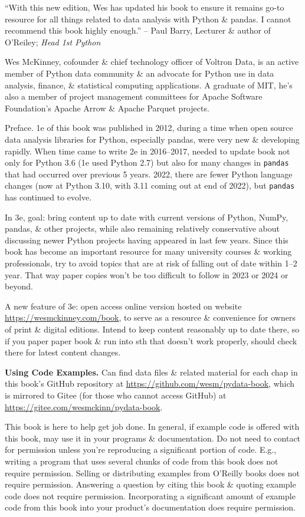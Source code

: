 \documentclass{article}
\begin{document}
``With this new edition, {\sc Wes} has updated his book to ensure it remains go-to resource for all things related to data analysis with Python \& pandas. I cannot recommend this book highly enough.'' -- {\sc Paul Barry}, Lecturer \& author of O'Reiley; {\it Head 1st Python}

{\sc Wes McKinney}, cofounder \& chief technology officer of Voltron Data, is an active member of Python data community \& an advocate for Python use in data analysis, finance, \& statistical computing applications. A graduate of MIT, he's also a member of project management committees for Apache Software Foundation's Apache Arrow \& Apache Parquet projects.

{\sf Preface.} 1e of this book was published in 2012, during a time when open source data analysis libraries for Python, especially pandas, were very new \& developing rapidly. When time came to write 2e in 2016--2017, needed to update book not only for Python 3.6 (1e used Python 2.7) but also for many changes in {\tt pandas} that had occurred over previous 5 years. 2022, there are fewer Python language changes (now at Python 3.10, with 3.11 coming out at end of 2022), but {\tt pandas} has continued to evolve.

In 3e, goal: bring content up to date with current versions of Python, NumPy, pandas, \& other projects, while also remaining relatively conservative about discussing newer Python projects having appeared in last few years. Since this book has become an important resource for many university courses \& working professionals, try to avoid topics that are at risk of falling out of date within 1--2 year. That way paper copies won't be too difficult to follow in 2023 or 2024 or beyond.

A new feature of 3e: open access online version hosted on website \url{https://wesmckinney.com/book}, to serve as a resource \& convenience for owners of print \& digital editions. Intend to keep content reasonably up to date there, so if you paper paper book \& run into sth that doesn't work properly, should check there for latest content changes.

{\bf Using Code Examples.} Can find data files \& related material for each chap in this book's GitHub repository at \url{https://github.com/wesm/pydata-book}, which is mirrored to Gitee (for those who cannot access GitHub) at \url{https://gitee.com/wesmckinn/pydata-book}.

This book is here to help get job done. In general, if example code is offered with this book, may use it in your programs \& documentation. Do not need to contact for permission unless you're reproducing a significant portion of code. E.g., writing a program that uses several chunks of code from this book does not require permission. Selling or distributing examples from O'Reilly books does not require permission. Answering a question by citing this book \& quoting example code does not require permission. Incorporating a significant amount of example code from this book into your product's documentation does require permission.
\end{document}
